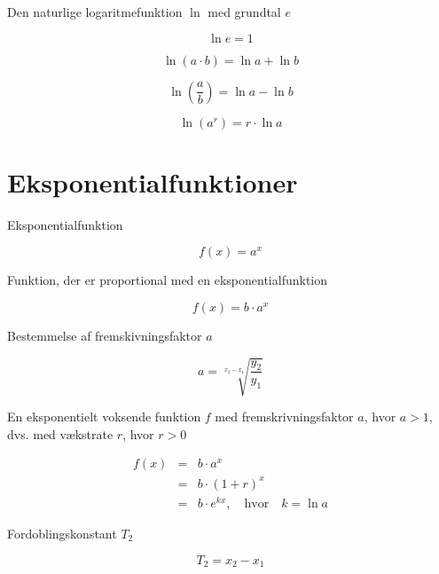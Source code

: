 \documentclass[11pt,a4paper,landscape,twocolumn,fleqn,leqno]{article}
\begin{document}
Den naturlige logaritmefunktion $\ln$ med grundtal $e$

\begin{equation}
\ln e = 1
\end{equation}

\begin{equation}
\ln (a \cdot b) = \ln a + \ln b
\end{equation}

\begin{equation}
\ln\left(\frac{a}{b}\right) = \ln a - \ln b
\end{equation}

\begin{equation}
\ln(a^r) = r \cdot \ln a
\end{equation}

\vfill

\section{Eksponentialfunktioner}

Eksponentialfunktion

\begin{equation}
f(x) = a^x
\end{equation}

Funktion, der er proportional med en eksponentialfunktion

\begin{equation}
f(x) = b \cdot a^x
\end{equation}

Bestemmelse af fremskivningsfaktor $a$

\begin{equation}
a = \sqrt[x_2-x_1]{\frac{y_2}{y_1}}
\end{equation}

En eksponentielt voksende funktion $f$ med fremskrivningsfaktor $a$, hvor $a > 1$, dvs. med vækstrate $r$, hvor $r > 0$

\begin{eqnarray}
f(x) & = & b \cdot a^x \\
 & = & b \cdot (1+r)^x \nonumber \\
 & = & b \cdot e^{kx}, \quad \text{hvor} \quad k = \ln a \nonumber
\end{eqnarray}

Fordoblingskonstant $T_2$

\begin{equation}
T_2 = x_2 - x_1
\end{equation}
\end{document}
